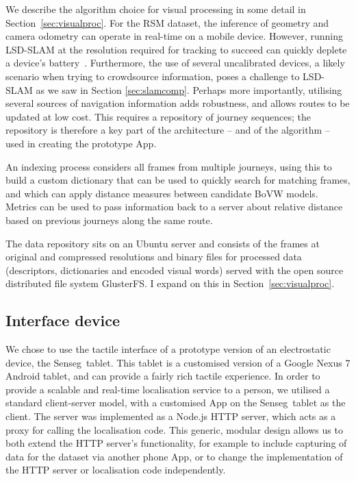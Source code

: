 We describe the algorithm choice for visual processing in some detail in Section~\ref{sec:visualproc}.  For the RSM dataset, the inference of geometry and camera odometry can operate in real-time on a mobile device. However, running LSD-SLAM at the resolution required for tracking to succeed can quickly deplete a device's battery~\cite{engel14eccv}.  Furthermore, the use of several uncalibrated devices, a likely scenario when trying to crowdsource information, poses a challenge to LSD-SLAM as we saw in Section \ref{sec:slamcomp}. Perhaps more importantly, utilising several sources of navigation information adds robustness, and allows routes to be updated at low cost. This requires a repository of journey sequences; the repository is therefore a key part of the architecture -- and of the algorithm -- used in creating the prototype App. 

An indexing process considers all frames from multiple journeys, using this to build a custom dictionary that can be used to quickly search for matching frames, and which can apply distance measures between candidate BoVW models. Metrics can be used to pass information back to a server about relative distance based on previous journeys along the same route. 

The data repository sits on an Ubuntu server and consists of the frames at original and compressed resolutions and binary files for processed data (descriptors, dictionaries and encoded visual words) served with the open source distributed file system GlusterFS. I expand on this in Section~\ref{sec:visualproc}. 

\subsection{Interface device} We chose to use the tactile interface of a prototype version of an electrostatic device, the Senseg\texttrademark\ tablet. This tablet is a customised version of a Google Nexus 7 Android tablet, and can provide a fairly rich tactile experience. In order to provide a scalable and real-time localisation service to a person, we utilised a standard client-server model, with a customised App on the Senseg\texttrademark\ tablet as the client. The server was implemented as a Node.js HTTP server, which acts as a proxy for calling the localisation code. This generic, modular design allows us to both extend the HTTP server's functionality, for example to include capturing of data for the dataset via another phone App, or to change the implementation of the HTTP server or localisation code independently.

